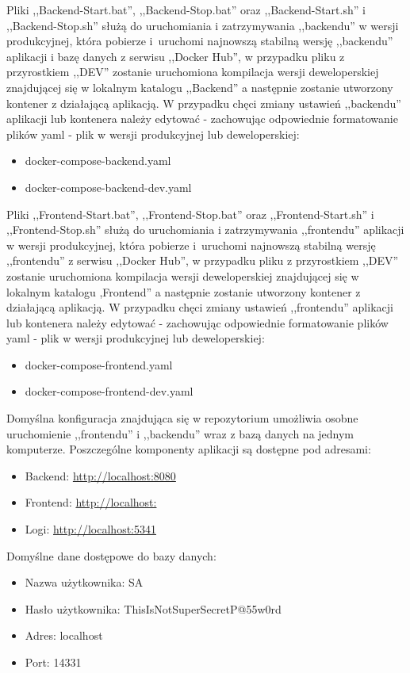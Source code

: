 \documentclass[12pt,a4paper]{article}
\begin{document}
		\indent Pliki ,,Backend-Start.bat'', ,,Backend-Stop.bat'' oraz ,,Backend-Start.sh'' i ,,Backend-Stop.sh'' służą do uruchomiania i zatrzymywania ,,backendu'' w wersji produkcyjnej,
			która pobierze i~uruchomi najnowszą stabilną wersję ,,backendu'' aplikacji i bazę danych z serwisu ,,Docker Hub'', w przypadku pliku z przyrostkiem ,,DEV''
			zostanie uruchomiona kompilacja wersji deweloperskiej znajdującej się w lokalnym katalogu ,,Backend'' a następnie zostanie utworzony kontener z działającą aplikacją.
			W przypadku chęci zmiany ustawień ,,backendu'' aplikacji lub kontenera należy edytować - zachowując odpowiednie formatowanie plików yaml - plik w wersji produkcyjnej
			lub deweloperskiej:
		\begin{itemize}
			\item docker-compose-backend.yaml
			\item docker-compose-backend-dev.yaml		
		\end{itemize}
			\indent Pliki ,,Frontend-Start.bat'', ,,Frontend-Stop.bat'' oraz ,,Frontend-Start.sh'' i ,,Frontend-Stop.sh'' służą do uruchomiania i zatrzymywania ,,frontendu''
			aplikacji w wersji produkcyjnej,
			która pobierze i~uruchomi najnowszą stabilną wersję ,,frontendu'' z serwisu ,,Docker Hub'', w przypadku pliku z przyrostkiem ,,DEV''
			zostanie uruchomiona kompilacja wersji deweloperskiej znajdującej się w lokalnym katalogu ,Frontend'' a następnie zostanie utworzony kontener z działającą aplikacją.
			W przypadku chęci zmiany ustawień ,,frontendu'' aplikacji lub kontenera należy edytować - zachowując odpowiednie formatowanie plików yaml - plik w wersji produkcyjnej
			lub deweloperskiej:
		\begin{itemize}
			\item docker-compose-frontend.yaml
			\item docker-compose-frontend-dev.yaml		
		\end{itemize}
		\indent Domyślna konfiguracja znajdująca się w repozytorium umożliwia osobne uruchomienie ,,frontendu'' i ,,backendu'' wraz z bazą danych na jednym komputerze.
			Poszczególne komponenty aplikacji są dostępne pod adresami:
		\begin{itemize}
			\item Backend: \url{http://localhost:8080}
			\item Frontend: \url{http://localhost:}
			\item Logi: \url{http://localhost:5341}
		\end{itemize}
		\indent Domyślne dane dostępowe do bazy danych:
		\begin{itemize}
			\item Nazwa użytkownika: SA
			\item Hasło użytkownika: ThisIsNotSuperSecretP@55w0rd
			\item Adres: localhost
			\item Port: 14331
		\end{itemize}
			
\end{document}
